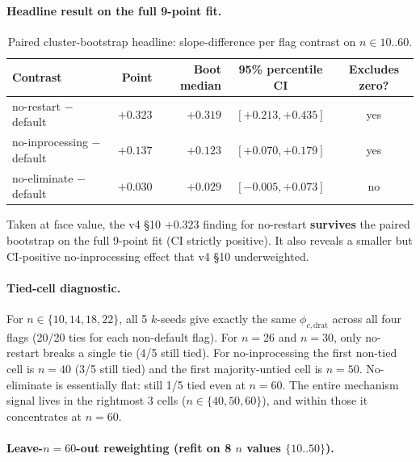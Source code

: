\documentclass[11pt,a4paper]{article}
\theoremstyle{remark}
\begin{document}
{\paragraph{Headline result on the full 9-point fit.}

\begin{table}[H]
\centering
\small
\begin{tabular}{@{}lrrcc@{}}
\toprule
Contrast & Point & Boot median & 95\% percentile CI & Excludes zero? \\
\midrule
no-restart $-$ default & $+0.323$ & $+0.319$ & $[+0.213, +0.435]$ & yes \\
no-inprocessing $-$ default & $+0.137$ & $+0.123$ & $[+0.070, +0.179]$ & yes \\
no-eliminate $-$ default & $+0.030$ & $+0.029$ & $[-0.005, +0.073]$ & no \\
\bottomrule
\end{tabular}
\caption{Paired cluster-bootstrap headline: slope-difference per flag contrast on $n\in 10..60$.}
\label{tab:boot-headline}
\end{table}

Taken at face value, the v4 \S10 $+0.323$ finding for no-restart
\textbf{survives} the paired bootstrap on the full 9-point fit (CI
strictly positive). It also reveals a smaller but CI-positive
no-inprocessing effect that v4 \S10 underweighted.

\paragraph{Tied-cell diagnostic.} For $n \in \{10,14,18,22\}$, all 5
$k$-seeds give exactly the same $\phi_{c,\mathrm{drat}}$ across all four
flags (20/20 ties for each non-default flag). For $n=26$ and $n=30$, only
no-restart breaks a single tie (4/5 still tied). For no-inprocessing the
first non-tied cell is $n=40$ (3/5 still tied) and the first
majority-untied cell is $n=50$. No-eliminate is essentially flat: still
1/5 tied even at $n=60$. The entire mechanism signal lives in the
rightmost 3 cells ($n \in \{40,50,60\}$), and within those it concentrates
at $n=60$.

\paragraph{Leave-$n=60$-out reweighting (refit on 8 $n$ values
$\{10..50\}$).}

}
\end{document}
